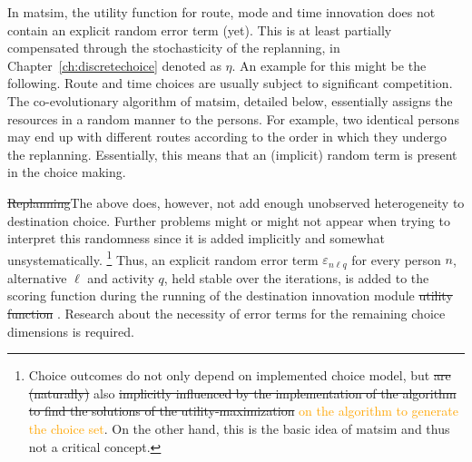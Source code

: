 In \gls{matsim}, the utility function for route, mode and time innovation does not contain an explicit random error term (yet). 
This is at least partially compensated through the stochasticity of the replanning, in Chapter~\ref{ch:discretechoice} denoted as $\eta$. 
An example for this might be the following.
Route and time choices are usually subject to significant competition. 
The co-evolutionary algorithm of \gls{matsim}, detailed below, essentially assigns the resources in a random manner to the persons. 
For example, two identical persons may end up with different routes according to the order in which they undergo the replanning. 
Essentially, this means that an (implicit) random term is present in the choice making.

\st{Replanning}{\orange The above} does, however, not add enough unobserved heterogeneity to destination choice.
Further problems might or might not appear when trying to interpret this randomness {\orange since it is} added implicitly and somewhat unsystematic{\orange ally}.%
\footnote{Choice outcomes do not only depend on implemented choice model, but \st{are (naturally)} also \st{implicitly influenced by the implementation of the algorithm to find the solutions of the utility-maximization} \textcolor{orange}{on the algorithm to generate the} \textcolor{orange}{choice set}.  On the other hand, this is the basic idea of \gls{matsim} and thus not a critical concept. 
}
Thus, an explicit random error term $\varepsilon_{n\ell q}$ for every person $n$, alternative $\ell$ and activity $q$, held stable over the iterations, is added to the {\orange scoring function during the running of the} destination innovation {\orange module} \st{utility function} \citep[][]{Horni_PhDThesis_2013}. 
Research about the necessity of error terms for the remaining choice dimensions is required. 

